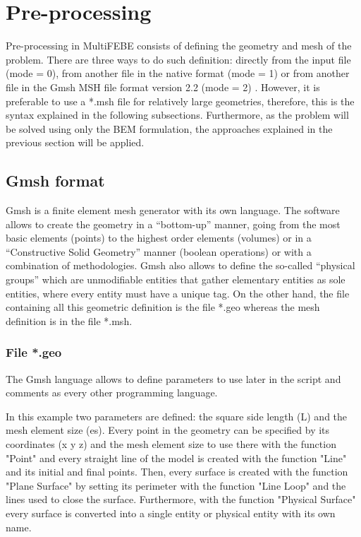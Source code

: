 \documentclass[a4]{article}
\begin{document}
\section{Pre-processing} 
Pre-processing in MultiFEBE consists of defining the geometry and mesh of the problem. There are three ways to do such definition: directly from the input file (mode = 0), from another file in the native format (mode = 1) or from another file in the Gmsh MSH file format version 2.2 (mode = 2) \cite{gmsh}. However, it is preferable to use a *.msh file for relatively large geometries, therefore, this is the syntax explained in the following subsections. Furthermore, as the problem will be solved using only the BEM formulation, the approaches explained in the previous section will be applied.      

\subsection{Gmsh format}
Gmsh \cite{gmsh, gmshweb} is a finite element mesh generator with its own language. The software allows to create the geometry in a “bottom-up” manner, going from the most basic elements (points) to the highest order elements (volumes) or in a “Constructive Solid Geometry” manner (boolean operations) or with a combination of methodologies. Gmsh also allows to define  the so-called “physical groups” which are unmodifiable entities that gather elementary entities as sole entities, where every entity must have a unique tag. On the other hand, the file containing all this geometric definition is the file *.geo whereas the mesh definition is in the file *.msh. 

\subsubsection{File *.geo}

The Gmsh language allows to define parameters to use later in the script and comments as every other programming language. 

In this example two parameters are defined: the square side length (L) and the mesh element size (es). Every point in the geometry can be specified by its coordinates (x y z) and the mesh element size to use there with the function "Point" and every straight line of the model is created with the function "Line" and its initial and final points. Then, every surface is  created with the function "Plane Surface" by setting its perimeter with the function "Line Loop" and the lines used to close the surface. Furthermore, with the function "Physical Surface" every surface is converted into a single entity or physical entity with its own name.  
\end{document}
